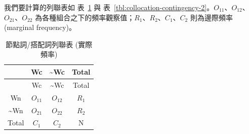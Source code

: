 我們要計算的列聯表如 表~\ref{tbl:collocation-contingency} 與
表~\ref{tbl:collocation-contingency-2}。\(O_{11}\)、\(O_{12}\)、\(O_{21}\)、\(O_{22}\)
為各種組合之下的頻率觀察值；\(R_{1}\)、\(R_{2}\)、\(C_{1}\)、\(C_{2}\)
則為邊際頻率 (marginal frequency)。

\hypertarget{tbl:collocation-contingency}{}
\begin{longtable}[]{@{}cccc@{}}
\caption{\label{tbl:collocation-contingency}節點詞/搭配詞列聯表
(實際頻率)}\tabularnewline
\toprule()
& Wc & \textasciitilde Wc & Total \\
\midrule()
\endfirsthead
\toprule()
& Wc & \textasciitilde Wc & Total \\
\midrule()
\endhead
Wn & \(O_{11}\) & \(O_{12}\) & \(R_{1}\) \\
\textasciitilde Wn & \(O_{21}\) & \(O_{22}\) & \(R_{2}\) \\
Total & \(C_{1}\) & \(C_{2}\) & N \\
\bottomrule()
\end{longtable}

